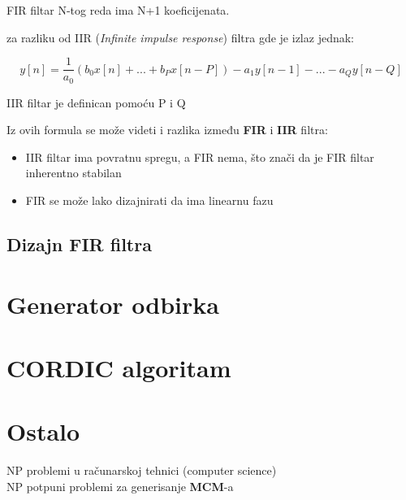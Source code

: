 \documentclass[journal,twocolumn,letterpaper]{IEEEJERM}
\begin{document}
FIR filtar N-tog reda ima N+1 koeficijenata.

za razliku od IIR (\textit{Infinite impulse response}) filtra gde je izlaz jednak:

\begin{equation}
y[n] =\dfrac{1}{a_0} (b_0 x[n] + ... + b_P x[n-P]) - a_1 y[n-1] - ... - a_Q y[n-Q]
\end{equation}

IIR filtar je definican pomoću P i Q

Iz ovih formula se može videti i razlika između \textbf{FIR} i \textbf{IIR} filtra:

\begin{itemize}
	\item IIR filtar ima povratnu spregu, a FIR nema, što znači da je FIR filtar inherentno stabilan
	\item FIR se može lako dizajnirati da ima linearnu fazu
\end{itemize}


\subsection{Dizajn FIR filtra}

\section{Generator odbirka}


\section{CORDIC algoritam}


\section{Ostalo}

NP problemi u računarskoj tehnici (computer science) \\

NP potpuni problemi za generisanje \textbf{MCM}-a 
\end{document}
